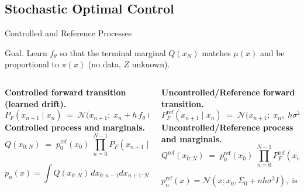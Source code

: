 \documentclass[aspectratio=169,xcolor=dvipsnames]{beamer}
\begin{document}
\subsection{Stochastic Optimal Control}
\begin{frame}[t]{Controlled and Reference Processes}

\scriptsize

\vspace{-0.2cm}

\begin{block}{\scriptsize Goal.} Learn $f_\theta$ so that the terminal marginal $Q(x_N)$ matches $\mu(x)$ and be proportional to $\pi(x)$ (no data, $Z$ unknown).
\end{block}

\medskip

\begin{columns}[t]
\begin{column}{0.48\textwidth}
\textbf{Controlled forward transition (learned drift).}
\[
P_F(x_{n+1}\mid x_n)\;=\;\mathcal N\!\big(x_{n+1};\;x_n + h\,f_\theta(x_n,n),\;h\sigma^2 I\big)
\]
\textbf{Controlled process and marginals.}
\[
Q(x_{0:N})\;=\;p^{\text{ref}}_0(x_0)\;\prod_{n=0}^{N-1} P_F(x_{n+1}\mid x_n)
\]

\[
p_n(x) = \int Q(x_{0:N})\,dx_{0:n-1}dx_{n+1:N}, \;\text{no closed form.}
\]

\end{column}
\begin{column}{0.48\textwidth}
\textbf{Uncontrolled/Reference forward transition.}
\[
P_F^{\text{ref}}(x_{n+1}\mid x_n)\;=\;\mathcal N\!\big(x_{n+1};\;x_n,\;h\sigma^2 I\big)
\]
\textbf{Uncontrolled/Reference process and marginals.}
\[
Q^{\text{ref}}(x_{0:N})\;=\;p^{\text{ref}}_0(x_0)\;\prod_{n=0}^{N-1} P_F^{\text{ref}}(x_{n+1}\mid x_n),
\]

\[
p^{\text{ref}}_n(x) = \mathcal{N}\left( x; x_0, \Sigma_0 + n h \sigma^2 I \right), \;\text{is closed form.}
\]
\end{column}
\end{columns}


\end{frame}
\end{document}
